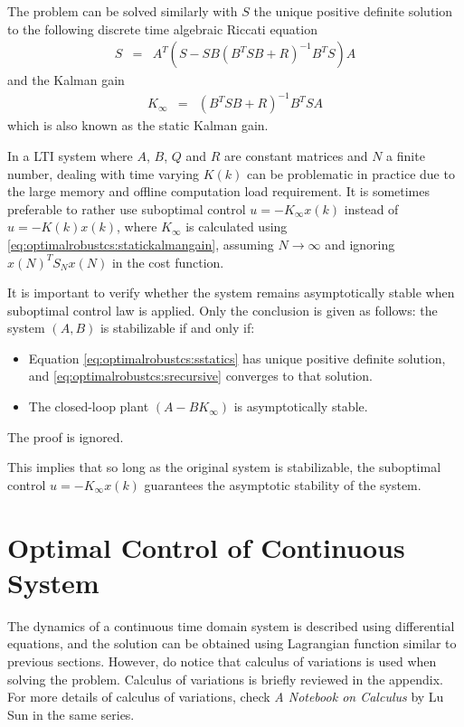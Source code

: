 The problem can be solved similarly with $S$ the unique positive definite solution to the following discrete time algebraic Riccati equation
\begin{eqnarray}
	S &=&  A^T\left(S-SB\left(B^TSB + R\right)^{-1}B^TS\right)A \label{eq:optimalrobustcs:sstatics}
\end{eqnarray}
and the Kalman gain
\begin{eqnarray}
	K_\infty &=& \left(B^TSB + R\right)^{-1}B^TSA \label{eq:optimalrobustcs:statickalmangain}
\end{eqnarray}
which is also known as the static Kalman gain.

In a LTI system where $A$, $B$, $Q$ and $R$ are constant matrices and $N$ a finite number, dealing with time varying $K(k)$ can be problematic in practice due to the large memory and offline computation load requirement. It is sometimes preferable to rather use suboptimal control $u=-K_\infty x(k)$ instead of $u=-K(k)x(k)$, where $K_\infty$ is calculated using \eqref{eq:optimalrobustcs:statickalmangain}, assuming $N\rightarrow\infty$ and ignoring $x(N)^TS_Nx(N)$ in the cost function.

It is important to verify whether the system remains asymptotically stable when suboptimal control law is applied. Only the conclusion is given as follows: the system $(A,B)$ is stabilizable if and only if:
\begin{itemize}
	\item Equation \eqref{eq:optimalrobustcs:sstatics} has unique positive definite solution, and \eqref{eq:optimalrobustcs:srecursive} converges to that solution.
	\item The closed-loop plant $(A-BK_\infty)$ is asymptotically stable.
\end{itemize}
The proof is ignored.

This implies that so long as the original system is stabilizable, the suboptimal control $u=-K_\infty x(k)$ guarantees the asymptotic stability of the system.

\section{Optimal Control of Continuous System}

The dynamics of a continuous time domain system is described using differential equations, and the solution can be obtained using Lagrangian function similar to previous sections. However, do notice that calculus of variations is used when solving the problem. Calculus of variations is briefly reviewed in the appendix. For more details of calculus of variations, check \textit{A Notebook on Calculus} by Lu Sun in the same series.

